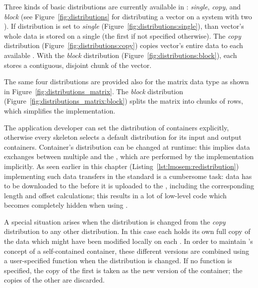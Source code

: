 Three kinds of basic distributions are currently available in \SkelCL:
\emph{single}, \emph{copy}, and \emph{block} (see Figure~\ref{fig:distributions} for distributing a vector on a system with two \GPUs).
If distribution is set to \emph{single} (Figure~\ref{fig:distributions:single}), than vector's whole data is stored on a single \GPU (the first \GPU if not specified otherwise).
The \emph{copy} distribution (Figure~\ref{fig:distributions:copy}) copies vector's entire data to each available \GPU.
With the \emph{block} distribution (Figure~\ref{fig:distributions:block}), each \GPU stores a contiguous, disjoint chunk of the vector.

The same four distributions are provided also for the matrix data type as shown in Figure~\ref{fig:distributions_matrix}.
The \emph{block} distribution (Figure~\ref{fig:distributions_matrix:block}) splits the matrix into chunks of rows, which simplifies the implementation.


The application developer can set the distribution of containers explicitly, otherwise every skeleton selects a default distribution for its input and output containers.
Container's distribution can be changed at runtime:
this implies data exchanges between multiple \GPUs and the \CPU, which are performed by the \SkelCL implementation implicitly.
As seen earlier in this chapter (Listing~\ref{lst:lmosem:redistribution}) implementing such data transfers in the standard \OpenCL is a cumbersome task:
data has to be downloaded to the \CPU before it is uploaded to the \GPUs, including the corresponding length and offset calculations;
this results in a lot of low-level code which becomes completely hidden when using \SkelCL.

A special situation arises when the distribution is changed from the \emph{copy} distribution to any other distribution.
In this case each \GPU holds its own full copy of the data which might have been modified locally on each \GPU.
In order to maintain \SkelCL's concept of a self-contained container, these different versions are combined using a user-specified function when the distribution is changed.
If no function is specified, the copy of the first \GPU is taken as the new version of the container; the copies of the other \GPUs are discarded.


